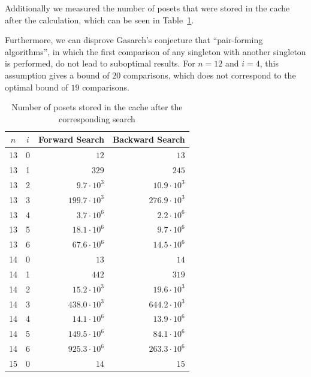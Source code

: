 \documentclass[twoside,leqno,twocolumn]{article}
\begin{document}
Additionally we measured the number of posets that were stored in the cache after the calculation, which can be seen in Table~\ref{table:cache_entries}.

Furthermore, we can disprove Gasarch's \cite{Gasarch1996} conjecture that ``pair-forming algorithms'', in which the first comparison of any singleton with another singleton is performed, do not lead to suboptimal results.
For $n = 12$ and $i = 4$, this assumption gives a bound of $20$ comparisons, which does not correspond to the optimal bound of $19$ comparisons.

\begin{table}[!t]
  \renewcommand{\arraystretch}{1.2}
  \caption{Number of posets stored in the cache after the corresponding search}
  \label{table:cache_entries}
  \centering
  \begin{tabular}{c|c|r|r}
    $n$ & $i$ & \textbf{Forward Search} & \textbf{Backward Search} \\
    \hline
    13  & 0   & $12$                    & $13$                     \\
    13  & 1   & $329$                   & $245$                    \\
    13  & 2   & $9.7 \cdot 10^3$        & $10.9 \cdot 10^3$        \\
    13  & 3   & $199.7 \cdot 10^3$      & $276.9 \cdot 10^3$       \\
    13  & 4   & $3.7 \cdot 10^6$        & $2.2 \cdot 10^6$         \\
    13  & 5   & $18.1 \cdot 10^6$       & $9.7 \cdot 10^6$         \\
    13  & 6   & $67.6 \cdot 10^6$       & $14.5 \cdot 10^6$        \\
    \hline
    14  & 0   & $13$                    & $14$                     \\
    14  & 1   & $442$                   & $319$                    \\
    14  & 2   & $15.2 \cdot 10^3$       & $19.6 \cdot 10^3$        \\
    14  & 3   & $438.0 \cdot 10^3$      & $644.2 \cdot 10^3$       \\
    14  & 4   & $14.1 \cdot 10^6$       & $13.9 \cdot 10^6$        \\
    14  & 5   & $149.5 \cdot 10^6$      & $84.1 \cdot 10^6$        \\
    14  & 6   & $925.3 \cdot 10^6$      & $263.3 \cdot 10^6$       \\
    \hline
    15  & 0   & $14$                    & $15$                     \\

\end{tabular}
\end{table}
\end{document}
